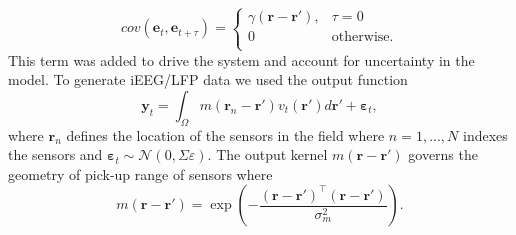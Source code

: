 \documentclass[12pt]{iopart}
\begin{document}
\begin{equation}
	cov(\mathbf{e}_t,\mathbf{e}_{t+\tau}) = \left\{ 
	\begin{array}{*{20}
		{c}} \gamma\left(\mathbf{r}-\mathbf{r'}\right), & \tau=0 \\
		0 & \mathrm{otherwise}. \\
	\end{array}
	\right. 
\end{equation}
This term was added to drive the system and account for uncertainty in the model. To generate iEEG/LFP data we used the output function 
\begin{equation}
	\mathbf{y}_t = \int_{\Omega}{m\left(\mathbf{r}_n-\mathbf{r}'\right)v_t\left(\mathbf{r}'\right)d\mathbf{r}'} + \boldsymbol{\varepsilon}_t, 
\end{equation}
where $\mathbf{r}_n$ defines the location of the sensors in the field where $n=1,...,N$ indexes the sensors and $\boldsymbol{\varepsilon}_t \sim \mathcal{N}\left(0,\Sigma{\varepsilon}\right)$. The output kernel $m(\mathbf{r}-\mathbf{r}')$ governs the geometry of pick-up range of sensors where 
\begin{equation}
	m\left(\mathbf{r}-\mathbf{r}'\right) = \exp{\left(-\frac{(\mathbf{r}-\mathbf{r}')^\top(\mathbf{r}-\mathbf{r}')}{\sigma_m^2}\right)}. 
\end{equation}
\end{document}
